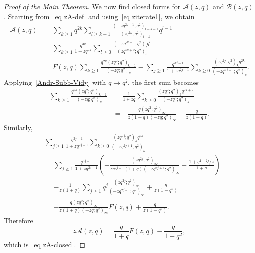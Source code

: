 \documentclass[reqno]{amsart}
\theoremstyle{definition}
\theoremstyle{plain}
\theoremstyle{remark}
\numberwithin{equation}{section}
\begin{document}
\begin{proof}[Proof of the Main Theorem]
We now find closed forms for $\mathcal A(z,q)$ and $\mathcal B(z,q)$. Starting from~\eqref{eq zA-def} and using~\eqref{eq ziterate1}, we obtain
\begin{align*}
\mathcal A(z,q)
&=\sum_{k\ge 1} q^{2k}\sum_{l\ge k+1}
\frac{(-zq^{2k+1};q^2)_{l-k-1}}{(zq^{2k};q^2)_{l-k}}q^{l-1}\\
&=\sum_{k\ge 1}\frac{q^{3k}}{1-zq^{2k}}
\sum_{l\ge 0}\frac{(-zq^{2k+1};q^2)_l q^l}{(zq^{2k+2};q^2)_l}\\
&=F(z,q)\sum_{k\ge 1}\frac{q^{2k}(zq^2;q^2)_{k-1}}{(-zq;q^2)_k}
-\sum_{j\ge 1}\frac{q^{3j-1}}{1+zq^{2j-1}}
\sum_{k\ge 0}\frac{(zq^{2j};q^2)_k q^{2k}}{(-zq^{2j+1};q^2)_k}.
\end{align*}
Applying~\eqref{Andr-Subb-Vidy} with $q\to q^2$, the first sum becomes
\begin{align*}
\sum_{k\ge 1}\frac{q^{2k}(zq^2;q^2)_{k-1}}{(-zq;q^2)_k}
&=\frac{1}{1+zq}\sum_{k\ge 0}\frac{(zq^2;q^2)_k q^{2k+2}}{(-zq^3;q^2)_k}\\
&=-\frac{q(zq^2;q^2)_\infty}{z(1+q)(-zq;q^2)_\infty}+\frac{q}{z(1+q)}.
\end{align*}
Similarly,
\begin{align*}
&\sum_{j\ge 1}\frac{q^{3j-1}}{1+zq^{2j-1}}
\sum_{k\ge 0}\frac{(zq^{2j};q^2)_k q^{2k}}{(-zq^{2j+1};q^2)_k} \\
&=\sum_{j\ge 1}\frac{q^{3j-1}}{1+zq^{2j-1}}
\left(
-\frac{(zq^{2j};q^2)_\infty}{zq^{2j-1}(1+q)(-zq^{2j+1};q^2)_\infty}
+\frac{1+q^{1-2j}/z}{1+q}
\right)\\
&=-\frac{1}{z(1+q)}\sum_{j\ge 1}q^j
\frac{(zq^{2j};q^2)_\infty}{(-zq^{2j-1};q^2)_\infty}
+\frac{q}{z(1-q^2)}\\
&=-\frac{q(zq^2;q^2)_\infty}{z(1+q)(-zq;q^2)_\infty}F(z,q)
+\frac{q}{z(1-q^2)}.
\end{align*}
Therefore
\[
z\mathcal A(z,q)=\frac{q}{1+q}F(z,q)-\frac{q}{1-q^2},
\]
which is~\eqref{eq zA-closed}.


\end{proof}
\end{document}
